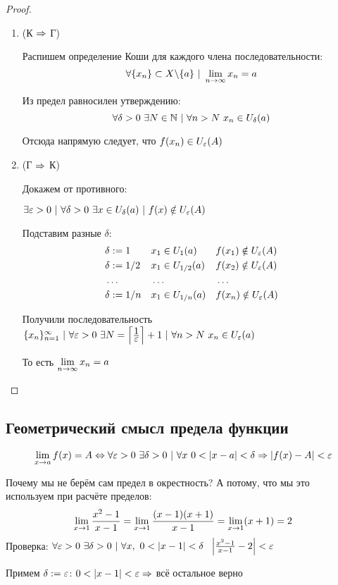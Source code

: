 \begin{proof}
	\begin{enumerate}
		\item (К $\Rightarrow$ Г)
		
		Распишем определение Коши для каждого члена последовательности: 
		$$
			\forall \{x_n\} \subset X \backslash \{a\}\ |\  \lim\limits_{n \rightarrow \infty} x_n = a
		$$
		
		Из предел равносилен утверждению: 
		$$
			\forall \delta > 0\ \exists N \in \N\ |\ \forall n > N\ x_n \in U_{\delta}(a)
		$$
		
		Отсюда напрямую следует, что $f(x_n) \in U_{\varepsilon}(A)$
		
		\item (Г $\Rightarrow$ К)
		
		Докажем от противного:
		
		$\exists \varepsilon > 0\ |\ \forall \delta > 0\ \exists x \in U_{\delta}(a)\ |\ f(x) \notin U_{\varepsilon}(A)$
		
		Подставим разные $\delta$:
		\begin{align*}
			&\delta := 1 & &{x_1 \in U_{1}(a)} & &{f(x_1) \notin U_{\varepsilon}(A)}
			\\
			&\delta := 1/2 & &{x_1 \in U_{1/2}(a)} & &{f(x_2) \notin U_{\varepsilon}(A)}
			\\
			&\dots & &\dots & &\dots
			\\
			&\delta := 1/n & &{x_1 \in U_{1/n}(a)} & &{f(x_n) \notin U_{\varepsilon}(A)}
		\end{align*}
		
		Получили последовательность $\{x_n\}_{n = 1}^\infty\ |\ \forall \varepsilon > 0\ \exists N = \left\lceil\frac{\displaystyle 1}{\displaystyle \varepsilon}\right\rceil + 1\ |\ \forall n > N\ x_n \in U_{\varepsilon}(a)$
		
		То есть $\lim\limits_{n \rightarrow \infty} x_n = a$
	\end{enumerate}
\end{proof}

\subsection{Геометрический смысл предела функции}

$$
	\lim\limits_{x \rightarrow a} f(x) = A \Leftrightarrow \forall \varepsilon > 0\ \exists \delta > 0\ |\ \forall x\ 0 < |x - a| < \delta \Rightarrow |f(x) - A| < \varepsilon
$$


\begin{example}
	Почему мы не берём сам предел в окрестность? А потому, что мы это используем при расчёте пределов:
	$$
		\lim\limits_{x \rightarrow 1} \frac{x^2 - 1}{x - 1} = \lim\limits_{x \rightarrow 1} \frac{(x - 1)(x + 1)}{x - 1} = \lim\limits_{x \rightarrow 1} (x + 1) = 2
	$$
	Проверка:
	$\forall \eps > 0\ \exists \delta > 0\ |\ \forall x,\ 0 < |x - 1| < \delta\ \ \left|\frac{x^2 - 1}{x - 1} - 2\right| < \eps$
	
	Примем $\delta := \varepsilon$: $0 < |x - 1| < \varepsilon \Rightarrow $ всё остальное верно
\end{example}


